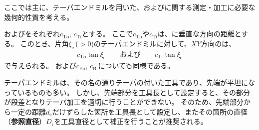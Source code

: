 

ここでは主に、テーパエンドミルを用いた、\textbf{\EndFaceOutCChamfer}および\textbf{\EndFaceInCChamfer}に関する測定・加工に必要な幾何的性質を考える。



\TopEndFaceOutCChamferLength および\TopEndFaceInCChamferLength をそれぞれ$c_\mathrm{To}$, $c_\mathrm{Ti}$とする。
ここで$c_\mathrm{To}$や$c_\mathrm{Ti}$は、\EndFace に垂直な方向の距離とする。
このとき、片角$\xi_\mathrm e$\,($>0$)のテーパエンドミルに対して、$XY$方向の\EndFaceCChamferLength は、
\begin{align*}
  c_\mathrm{To}\tan\xi_\mathrm e\qquad\text{および}\qquad c_\mathrm{Ti}\tan\xi_\mathrm e
\end{align*}
で与えられる。
\BottomEndFaceOutCChamferLength および\TopEndFaceInCChamferLength$c_\mathrm{Bo}$, $c_\mathrm{Bi}$についても同様である。



テーパエンドミルは、その名の通りテーパの付いた工具であり、先端が平坦になっているものも多い。
しかし、先端部分を工具長として設定すると、その部分が段差となりテーパ加工を適切に行うことができない。
そのため、先端部分から一定の距離$d_\mathrm e$だけずらした箇所を工具長として設定し、またその箇所の直径（\textbf{参照直径}）$D_\mathrm r$を工具直径として補正を行うことが推奨される。

